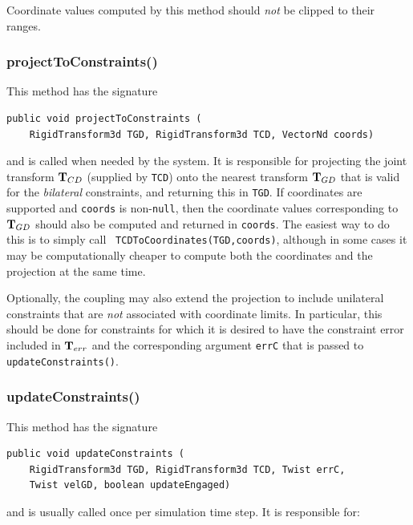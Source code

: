 \begin{sideblock}
Coordinate values computed by this method should {\it not} be clipped
to their ranges.
\end{sideblock}

\subsubsection*{projectToConstraints()}

This method has the signature
\begin{lstlisting}[]
  public void projectToConstraints (
    RigidTransform3d TGD, RigidTransform3d TCD, VectorNd coords)
\end{lstlisting}
%
and is called when needed by the system. It is responsible for
projecting the joint transform ${\bf T}_{CD}$ (supplied by {\tt TCD}) onto
the nearest transform ${\bf T}_{GD}$ that is valid for the {\it bilateral}
constraints, and returning this in {\tt TGD}.  If coordinates are
supported and {\tt coords} is non-{\tt null}, then the coordinate
values corresponding to ${\bf T}_{GD}$ should also be computed and returned
in {\tt coords}. The easiest way to do this is to simply call {\tt
TCDToCoordinates(TGD,coords)}, although in some cases it may be
computationally cheaper to compute both the coordinates and the
projection at the same time.

Optionally, the coupling may also extend the projection to include
unilateral constraints that are {\it not} associated with coordinate
limits. In particular, this should be done for constraints for which
it is desired to have the constraint error included in ${\bf T}_{err}$ and
the corresponding argument {\tt errC} that is passed to {\tt
updateConstraints()}.

\subsubsection*{updateConstraints()}

This method has the signature
%
\begin{lstlisting}[]
  public void updateConstraints (
    RigidTransform3d TGD, RigidTransform3d TCD, Twist errC,
    Twist velGD, boolean updateEngaged)
\end{lstlisting}
%
and is usually called once per simulation time step. It is responsible
for:


